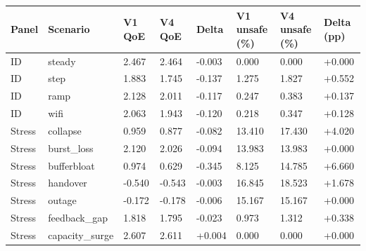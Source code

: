 \begin{tabular}{llllllll}
\toprule
Panel & Scenario & V1 QoE & V4 QoE & Delta & V1 unsafe (\%) & V4 unsafe (\%) & Delta (pp) \\
\midrule
ID & steady & 2.467 & 2.464 & -0.003 & 0.000 & 0.000 & +0.000 \\
ID & step & 1.883 & 1.745 & -0.137 & 1.275 & 1.827 & +0.552 \\
ID & ramp & 2.128 & 2.011 & -0.117 & 0.247 & 0.383 & +0.137 \\
ID & wifi & 2.063 & 1.943 & -0.120 & 0.218 & 0.347 & +0.128 \\
Stress & collapse & 0.959 & 0.877 & -0.082 & 13.410 & 17.430 & +4.020 \\
Stress & burst\_loss & 2.120 & 2.026 & -0.094 & 13.983 & 13.983 & +0.000 \\
Stress & bufferbloat & 0.974 & 0.629 & -0.345 & 8.125 & 14.785 & +6.660 \\
Stress & handover & -0.540 & -0.543 & -0.003 & 16.845 & 18.523 & +1.678 \\
Stress & outage & -0.172 & -0.178 & -0.006 & 15.167 & 15.167 & +0.000 \\
Stress & feedback\_gap & 1.818 & 1.795 & -0.023 & 0.973 & 1.312 & +0.338 \\
Stress & capacity\_surge & 2.607 & 2.611 & +0.004 & 0.000 & 0.000 & +0.000 \\
\bottomrule
\end{tabular}
